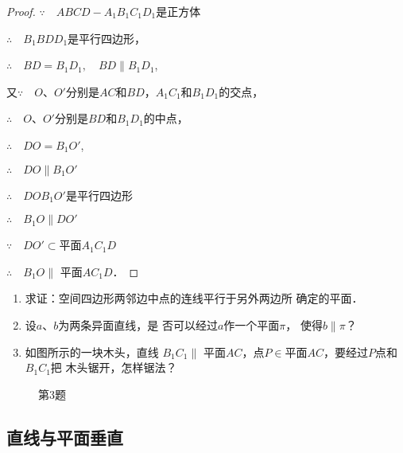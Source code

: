 \begin{proof}  
  $\because\quad ABCD-A_1B_1C_1D_1$是正方体

$\therefore\quad   B_1BDD_1$是平行四边形，

$\therefore\quad BD=B_1D_1,\quad  BD\parallel B_1D_1$,

又$\because\quad O$、$O'$分别是$AC$和$BD$，$A_1C_1$和$B_1D_1$的交点，

$\therefore\quad O$、$O'$分别是$BD$和$B_1D_1$的中点，

$\therefore\quad DO=B_1O'$,

$\therefore\quad   DO\parallel B_1O'$

$\therefore\quad   DOB_1O'$是平行四边形

$\therefore\quad   B_1O\parallel DO'$

$\because\quad DO'\subset$平面$A_1C_1D$

$\therefore\quad  B_1O\parallel$ 平面$AC_1D$．
\end{proof}

\begin{ex}
\begin{enumerate}
  \item 求证：空间四边形两邻边中点的连线平行于另外两边所
  确定的平面．
  \item 设$a$、$b$为两条异面直线，是
  否可以经过$a$作一个平面$\pi$，
  使得$b\parallel \pi$？
  \item 如图所示的一块木头，直线
  $B_1C_1\parallel$ 平面$AC$，点$P\in$平面$AC$，要经过$P$点和$B_1C_1$把
  木头锯开，怎样锯法？
\end{enumerate}
\end{ex}

\begin{figure}[htp]
  \centering
{}
  \caption*{第3题}
\end{figure}

\subsection{直线与平面垂直}


